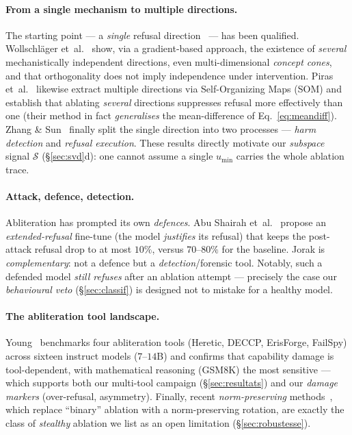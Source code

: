 \documentclass[11pt,a4paper]{article}
\theoremstyle{definition}
\theoremstyle{plain}
\begin{document}
\paragraph{From a single mechanism to multiple directions.}
The starting point — a \emph{single} refusal direction~\cite{arditi2024} — has been
qualified. Wollschläger et~al.~\cite{wollschlager2025} show, via a gradient-based
approach, the existence of \emph{several} mechanistically independent directions, even
multi-dimensional \emph{concept cones}, and that orthogonality does not imply
independence under intervention. Piras et~al.~\cite{piras2025} likewise extract
multiple directions via Self-Organizing Maps (SOM) and establish that ablating
\emph{several} directions suppresses refusal more effectively than one (their method in
fact \emph{generalises} the mean-difference of Eq.~\eqref{eq:meandiff}). Zhang \&
Sun~\cite{zhang2025dbdi} finally split the single direction into two processes —
\emph{harm detection} and \emph{refusal execution}. These results directly motivate our
\emph{subspace} signal $\mathcal{S}$ (\S\ref{sec:svd}d): one cannot assume a single
$u_{\min}$ carries the whole ablation trace.

\paragraph{Attack, defence, detection.}
Abliteration has prompted its own \emph{defences}. Abu Shairah et~al.~\cite{abushairah2025}
propose an \emph{extended-refusal} fine-tune (the model \emph{justifies} its refusal)
that keeps the post-attack refusal drop to at most $10\%$, versus $70$--$80\%$ for the
baseline. Jorak is \emph{complementary}: not a defence but a \emph{detection}/forensic
tool. Notably, such a defended model \emph{still refuses} after an ablation attempt —
precisely the case our \emph{behavioural veto} (\S\ref{sec:classif}) is designed not to
mistake for a healthy model.

\paragraph{The abliteration tool landscape.}
Young~\cite{young2025} benchmarks four abliteration tools (Heretic, DECCP, ErisForge,
FailSpy) across sixteen instruct models ($7$--$14$B) and confirms that capability
damage is tool-dependent, with mathematical reasoning (GSM8K) the most sensitive —
which supports both our multi-tool campaign (\S\ref{sec:resultats}) and our
\emph{damage markers} (over-refusal, asymmetry). Finally, recent
\emph{norm-preserving} methods~\cite{dang2026,grimjim}, which replace ``binary''
ablation with a norm-preserving rotation, are exactly the class of \emph{stealthy}
ablation we list as an open limitation (\S\ref{sec:robustesse}).
\end{document}

